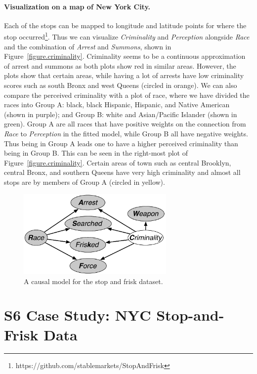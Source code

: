\paragraph{Visualization on a map of New York City.}
Each of the stops can be mapped to longitude and latitude points for
where the stop
occurred\footnote{https://github.com/stablemarkets/StopAndFrisk}. Thus
we can visualize \emph{Criminality} and \emph{Perception} alongside
\emph{Race} and the combination of \emph{Arrest} and \emph{Summons},
shown in Figure~\ref{figure.criminality}.  Criminality seems to be a
continuous approximation of arrest and summons as both plots show red
in similar areas. However, the plots show that certain areas, while
having a lot of arrests have low criminality scores such as south
Bronx and west Queens (circled in orange). We can also compare the
perceived criminality with a plot of race, where we have divided the
races into Group A: black, black Hispanic, Hispanic, and Native
American (shown in purple); and Group B: white and Asian/Pacific
Islander (shown in green). Group A are all races that have positive
weights on the connection from \emph{Race} to \emph{Perception} in the
fitted model, while Group B all have negative weights. Thus being in
Group A leads one to have a higher perceived criminality than being in
Group B. This can be seen in the right-most plot of
Figure~\ref{figure.criminality}. Certain areas of town such as central
Brooklyn, central Bronx, and southern Queens have very high
criminality and almost all stops are by members of Group A (circled in
yellow).


\begin{figure}[t]
\begin{center}
\centerline{\includegraphics[width=3in]{stop_and_frisk_model6.pdf}}
\caption{A causal model for the stop and frisk dataset.\label{figure.stop_and_frisk6}}
\end{center}
\end{figure}

\section*{S6 Case Study: NYC Stop-and-Frisk Data}
\label{sec:true-vs.-perceived}

